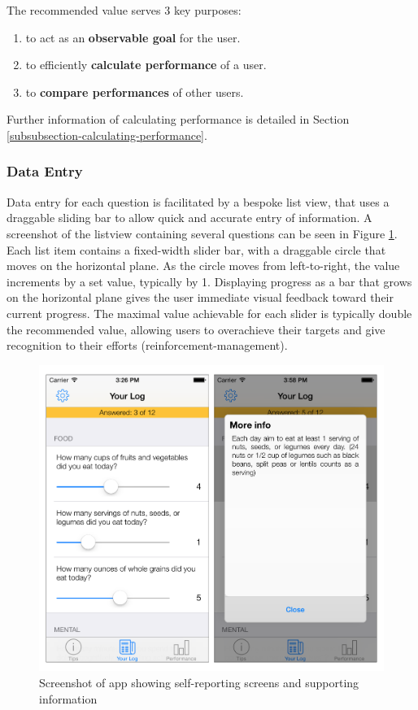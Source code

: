 The recommended value serves 3 key purposes:
\begin{enumerate}[noitemsep,topsep=0pt]
\item to act as an \textbf{observable goal} for the user.
\item to efficiently \textbf{calculate performance} of a user.
\item to \textbf{compare performances} of other users.
\end{enumerate}

Further information of calculating performance is detailed in Section \ref{subsubsection-calculating-performance}.

\subsubsection{Data Entry}
Data entry for each question is facilitated by a bespoke list view, that uses a draggable sliding bar to allow quick and accurate entry of information. A screenshot of the listview containing several questions can be seen in Figure \ref{fig: screenshot-measure}. Each list item contains a fixed-width slider bar, with a draggable circle that moves on the horizontal plane. As the circle moves from left-to-right, the value increments by a set value, typically by 1. Displaying progress as a bar that grows on the horizontal plane gives the user immediate visual feedback toward their current progress. The maximal value achievable for each slider is typically double the recommended value, allowing users to overachieve their targets and give recognition to their efforts (reinforcement-management).

\begin{figure}[h]
    \centering
    \includegraphics[scale=0.25, angle=0]{Files/prevention-study-1/figures/screenshot-measure.png}
    \caption{Screenshot of app showing self-reporting screens and supporting information}
    \label{fig: screenshot-measure}
\end{figure}

